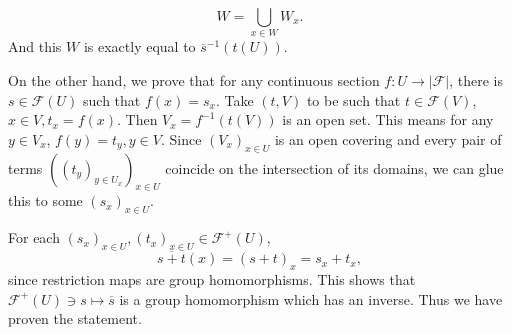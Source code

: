 \documentclass{article}
\begin{document}
\begin{equation*}
W = \bigcup_{x\in W}W_x.
\end{equation*}
And this $W$ is exactly equal to $\overline{s}^{-1}(t(U))$. \\
\par On the other hand, we prove that for any continuous section $f:U\to\vert\mathcal{F}\vert$, there is $s\in\mathcal{F}(U)$ such that $f(x) = s_x$. Take $(t,V)$ to be such that $t\in\mathcal{F}(V)$, $x\in V, t_x=f(x)$. Then $V_x=f^{-1}(t(V))$ is an open set. This means for any $y\in V_x$, $f(y)=t_y, y\in V$. Since $(V_x)_{x\in U}$ is an open covering and every pair of  terms $((t_y)_{y\in U_x})_{x\in U}$ coincide on the intersection of its domains, we can glue this to some $(s_x)_{x\in U}$. \\

\par For each $(s_x)_{x\in U},(t_x)_{x\in U}\in\mathcal{F}^+(U)$, 
\begin{equation*}
\overline{s+t}(x) = (s+t)_x = s_x+t_x, 
\end{equation*}
since restriction maps are group homomorphisms. This shows that $\mathcal{F}^+(U)\ni s\mapsto \overline{s}$ is a group homomorphism which has an inverse. Thus we have proven the statement.
\end{document}
